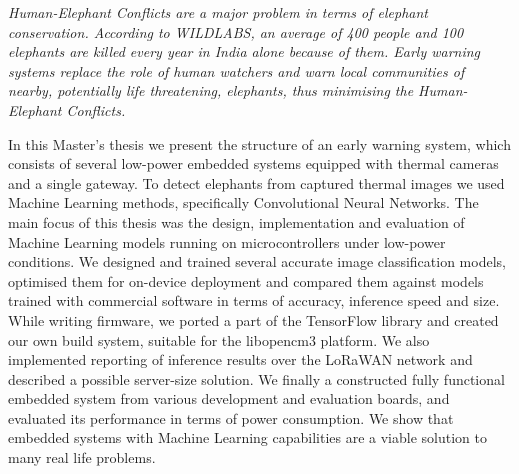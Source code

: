 {\itshape
Human-Elephant Conflicts are a major problem in terms of elephant conservation.
According to WILDLABS, an average of 400 people and 100 elephants are killed every year in India alone because of them. 
Early warning systems replace the role of human watchers and warn local communities of nearby, potentially life threatening, elephants, thus minimising the Human-Elephant Conflicts.

In this Master's thesis we present the structure of an early warning system, which consists of several low-power embedded systems equipped with thermal cameras and a single gateway.
To detect elephants from captured thermal images we used Machine Learning methods, specifically Convolutional Neural Networks.
The main focus of this thesis was the design, implementation and evaluation of Machine Learning models running on microcontrollers under low-power conditions.
We designed and trained several accurate image classification models, optimised them for on-device deployment and compared them against models trained with commercial software in terms of accuracy, inference speed and size.
While writing firmware, we ported a part of the TensorFlow library and created our own build system, suitable for the libopencm3 platform. 
We also implemented reporting of inference results over the LoRaWAN network and described a possible server-size solution.
We finally a constructed fully functional embedded system from various development and evaluation boards, and evaluated its performance in terms of power consumption.
We show that embedded systems with Machine Learning capabilities are a viable solution to many real life problems.
}
\newpage
